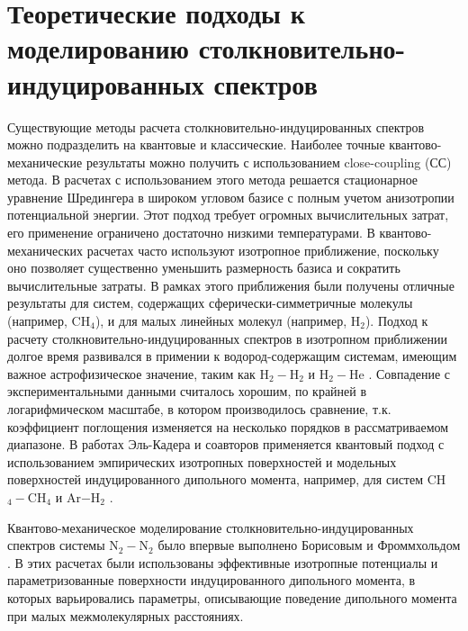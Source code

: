 \section{Теоретические подходы к моделированию столкновительно-индуцированных спектров}

Существующие методы расчета столкновительно-индуцированных спектров можно подразделить на квантовые и классические. Наиболее точные квантово-механические результаты можно получить с использованием close-coupling (СС) метода. В расчетах с использованием этого метода решается стационарное уравнение Шредингера в широком угловом базисе с полным учетом анизотропии потенциальной энергии. Этот подход требует огромных вычислительных затрат, его применение ограничено достаточно низкими температурами. В квантово-механических расчетах часто используют изотропное приближение, поскольку оно позволяет существенно уменьшить размерность базиса и сократить вычислительные затраты. В рамках этого приближения были получены отличные результаты для систем, содержащих сферически-симметричные молекулы (например, CH$_4$), и для малых линейных молекул (например, H$_2$). Подход к расчету столкновительно-индуцированных спектров в изотропном приближении долгое время развивался в примении к водород-содержащим системам, имеющим важное астрофизическое значение, таким как H$_2-$H$_2$ \cite{abel2009} и H$_2-$He \cite{abel2012}. Совпадение с экспериментальными данными считалось хорошим, по крайней в логарифмическом масштабе, в котором производилось сравнение, т.к. коэффициент поглощения изменяется на несколько порядков в рассматриваемом диапазоне. В работах Эль-Кадера и соавторов применяется квантовый подход с использованием эмпирических изотропных поверхностей и модельных поверхностей индуцированного дипольного момента, например, для систем CH$_4-$CH$_4$ \cite{elkader2012} и Ar$-$H$_2$ \cite{elkader2017}. \par
Квантово-механическое моделирование столкновительно-индуцированных спектров системы N$_2-$N$_2$ было впервые выполнено Борисовым и Фроммхольдом \cite{borysow1986}. В этих расчетах были использованы эффективные изотропные потенциалы и параметризованные поверхности индуцированного дипольного момента, в которых варьировались параметры, описывающие поведение дипольного момента при малых межмолекулярных расстояниях. \par
